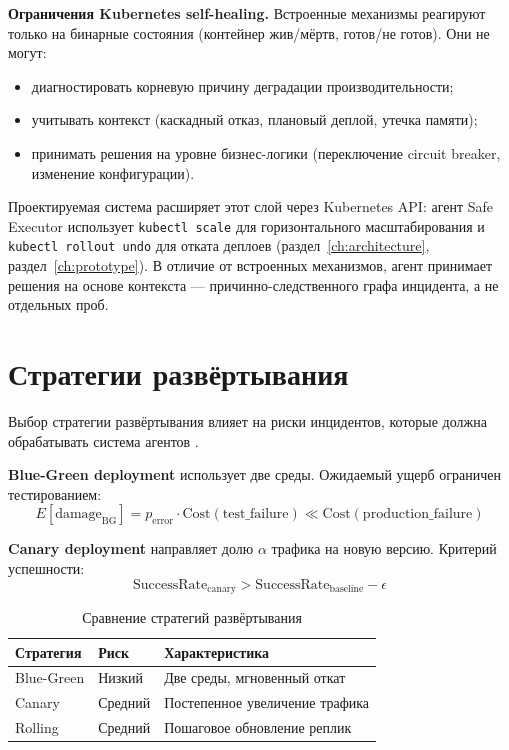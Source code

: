 \textbf{Ограничения Kubernetes self-healing.} Встроенные механизмы реагируют только на бинарные состояния (контейнер жив/мёртв, готов/не готов). Они не могут:
\begin{itemize}
    \item диагностировать корневую причину деградации производительности;
    \item учитывать контекст (каскадный отказ, плановый деплой, утечка памяти);
    \item принимать решения на уровне бизнес-логики (переключение circuit breaker, изменение конфигурации).
\end{itemize}

Проектируемая система расширяет этот слой через Kubernetes API: агент Safe Executor использует \texttt{kubectl scale} для горизонтального масштабирования и \texttt{kubectl rollout undo} для отката деплоев (раздел~\ref{ch:architecture}, раздел~\ref{ch:prototype}). В отличие от встроенных механизмов, агент принимает решения на основе контекста --- причинно-следственного графа инцидента, а не отдельных проб.

\section{Стратегии развёртывания}

Выбор стратегии развёртывания влияет на риски инцидентов, которые должна обрабатывать система агентов \cite{chaos_engineering,netflix_chaos}.

\textbf{Blue-Green deployment} использует две среды. Ожидаемый ущерб ограничен тестированием:
\begin{equation}
E[\text{damage}_{\text{BG}}] = p_{\text{error}} \cdot \text{Cost}(\text{test\_failure}) \ll \text{Cost}(\text{production\_failure})
\label{eq:bg_damage}
\end{equation}

\textbf{Canary deployment} направляет долю $\alpha$ трафика на новую версию. Критерий успешности:
\begin{equation}
\text{SuccessRate}_{\text{canary}} > \text{SuccessRate}_{\text{baseline}} - \epsilon
\label{eq:canary_success}
\end{equation}

\begin{table}[H]
\centering
\small

\caption{Сравнение стратегий развёртывания}
\label{tab:deploy_strategies}
\begin{tabular}{|>{\raggedright\arraybackslash}p{2.5cm}|>{\raggedright\arraybackslash}p{3cm}|>{\raggedright\arraybackslash}p{4.5cm}|}
\hline
Стратегия & Риск & Характеристика \\
\hline
Blue-Green & Низкий & Две среды, мгновенный откат \\
\hline
Canary & Средний & Постепенное увеличение трафика \\
\hline
Rolling & Средний & Пошаговое обновление реплик \\
\hline
\end{tabular}
\end{table}

